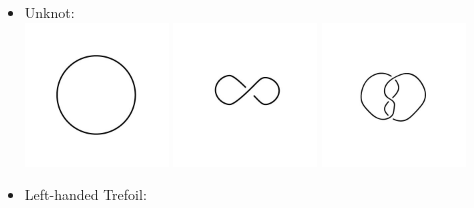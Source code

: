 \documentclass[12 pt]{article}
\begin{document}
\begin{itemize}
\item Unknot:\\
\includegraphics[height = 1.5in]{unknot_1.jpg} \includegraphics[height = 1.5in]{unknot_2.jpg} \includegraphics[height = 1.5in]{unknot_3.jpg}
\item Left-handed Trefoil:\\

\end{itemize}
\end{document}
